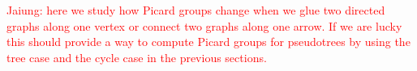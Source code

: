\documentclass[11pt,reqno]{amsart}
\DeclareMathOperator{\Pic}{Pic}
\theoremstyle{definition}
\theoremstyle{plain}
\newtheorem{lem}[mydef]{Lemma}
\begin{document}




	\textcolor{red}{Jaiung: here we study how Picard groups change when we glue two directed graphs along one vertex or
		connect two graphs along one arrow. If we are lucky this should provide a way to compute Picard groups for
		pseudotrees by using the tree case and the cycle case in the previous sections.}
\end{document}
